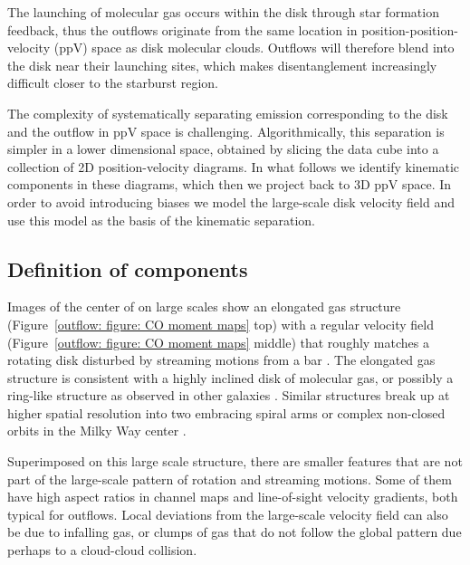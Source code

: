 The launching of molecular gas occurs within the disk through star formation feedback, thus the outflows originate from the same location in position-position-velocity (ppV) space as disk molecular clouds. Outflows will therefore blend into the disk near their launching sites, which makes disentanglement increasingly difficult closer to the starburst region.

The complexity of systematically separating emission corresponding to the disk and the outflow in ppV space is challenging. Algorithmically, this separation is simpler in a lower dimensional space, obtained by slicing the data cube into a collection of 2D position-velocity diagrams. In what follows we identify kinematic components in these diagrams, which then we project back to 3D ppV space. In order to avoid introducing biases we model the large-scale disk velocity field and use this model as the basis of the kinematic separation.


\subsection{Definition of components}
\label{outflow: subsection: definition disk non-disk}

Images of the center of  on large scales show an elongated gas structure (Figure~\ref{outflow: figure: CO moment maps} top) with a regular velocity field (Figure~\ref{outflow: figure: CO moment maps} middle) that roughly matches a rotating disk disturbed by streaming motions from a bar \citep[e.g.][]{2004ApJ...611..835P}. The elongated gas structure is consistent with a highly inclined disk of molecular gas, or possibly a ring-like structure as observed in other galaxies \citep[for example, NGC\,1512, NGC\,1808;][]{2016ApJ...823...68S,2018ApJ...857..116M}. 
Similar structures break up at higher spatial resolution into two embracing spiral arms or complex non-closed orbits in the Milky Way center \citep{2015MNRAS.453..739K,2016MNRAS.457.2675H,2018MNRAS.481....2S}. 

Superimposed on this large scale structure, there are smaller features that are not part of the large-scale pattern of rotation and streaming motions. Some of them have high aspect ratios in channel maps and line-of-sight velocity gradients, both typical for outflows. Local deviations from the large-scale velocity field can also be due to infalling gas, or clumps of gas that do not follow the global pattern due perhaps to a cloud-cloud collision.

